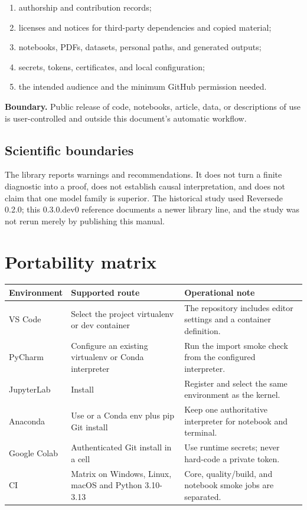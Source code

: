 \documentclass[10pt,a4paper,oneside]{article}
\newcommand{\code}[1]{\texttt{\small\detokenize{#1}}}
\newcommand{\warning}[1]{\textcolor{amber}{\textbf{Boundary.} #1}}
\begin{document}
\begin{enumerate}
  \item authorship and contribution records;
  \item licenses and notices for third-party dependencies and copied material;
  \item notebooks, PDFs, datasets, personal paths, and generated outputs;
  \item secrets, tokens, certificates, and local configuration;
  \item the intended audience and the minimum GitHub permission needed.
\end{enumerate}

\warning{Public release of code, notebooks, article, data, or descriptions of use is user-controlled
and outside this document's automatic workflow.}

\subsection{Scientific boundaries}
The library reports warnings and recommendations. It does not turn a finite diagnostic into a proof,
does not establish causal interpretation, and does not claim that one model family is superior.
The historical study used Reversede 0.2.0; this 0.3.0.dev0 reference documents a newer library line,
and the study was not rerun merely by publishing this manual.

\section{Portability matrix}\label{sec:portability}

\begin{longtable}{p{3.1cm}p{4.1cm}p{7.2cm}}
\toprule
Environment & Supported route & Operational note\\
\midrule
\endhead
VS Code & Select the project virtualenv or dev container & The repository includes editor settings and a container definition.\\
PyCharm & Configure an existing virtualenv or Conda interpreter & Run the import smoke check from the configured interpreter.\\
JupyterLab & Install \code{reversede-ai[notebook]} & Register and select the same environment as the kernel.\\
Anaconda & Use \code{environment.yml} or a Conda env plus pip Git install & Keep one authoritative interpreter for notebook and terminal.\\
Google Colab & Authenticated Git install in a cell & Use runtime secrets; never hard-code a private token.\\
CI & Matrix on Windows, Linux, macOS and Python 3.10-3.13 & Core, quality/build, and notebook smoke jobs are separated.\\
\bottomrule
\end{longtable}
\end{document}
